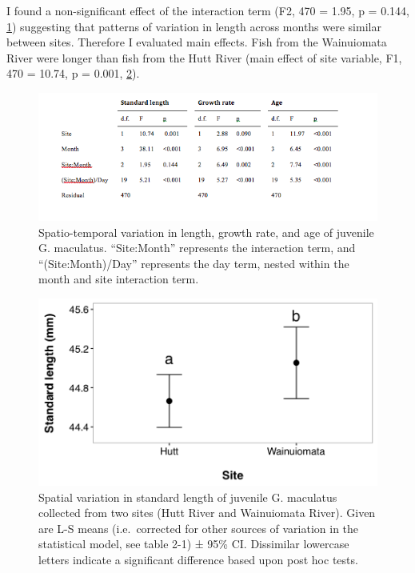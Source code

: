 \documentclass[]{book}
\begin{document}
I found a non-significant effect of the interaction term (F2, 470 =
1.95, p = 0.144, \ref{fig:anova1}) suggesting that patterns of variation
in length across months were similar between sites. Therefore I
evaluated main effects. Fish from the Wainuiomata River were longer than
fish from the Hutt River (main effect of site variable, F1, 470 = 10.74,
p = 0.001, \ref{fig:stdlengthsite}).

\begin{figure}
\centering
\includegraphics{images/anova_table1.png}
\caption{\label{fig:anova1}Spatio-temporal variation in length, growth rate,
and age of juvenile G. maculatus. ``Site:Month'' represents the
interaction term, and ``(Site:Month)/Day'' represents the day term,
nested within the month and site interaction term.}
\end{figure}

\begin{figure}
\centering
\includegraphics{images/std_length_fig1.png}
\caption{\label{fig:stdlengthsite}Spatial variation in standard length of
juvenile G. maculatus collected from two sites (Hutt River and
Wainuiomata River). Given are L-S means (i.e.~corrected for other
sources of variation in the statistical model, see table 2-1) ± 95\% CI.
Dissimilar lowercase letters indicate a significant difference based
upon post hoc tests.}
\end{figure}
\end{document}
